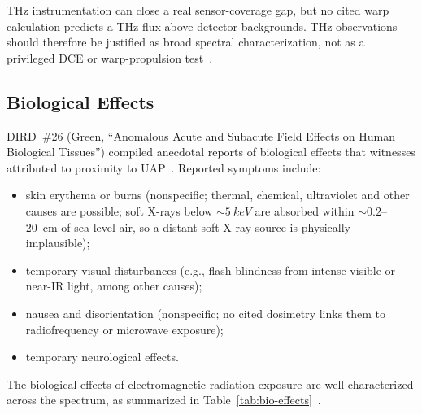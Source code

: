 \documentclass[aps,prd,twocolumn,superscriptaddress,nofootinbib,floatfix]{revtex4-2}
\begin{document}
THz instrumentation can close a real sensor-coverage gap, but no cited warp
calculation predicts a THz flux above detector backgrounds. THz observations should
therefore be justified as broad spectral characterization, not as a privileged DCE
or warp-propulsion test~\cite{Wilson2011,Schutzhold2011}.

\subsection{Biological Effects}\label{sec:bio-effects}

DIRD~\#26 (Green, ``Anomalous Acute and Subacute Field Effects on Human Biological
Tissues'') compiled anecdotal reports of biological effects that witnesses
attributed to proximity to UAP~\cite{DIRD_Green}. Reported symptoms include:
\begin{itemize}
  \item skin erythema or burns (nonspecific; thermal, chemical, ultraviolet and
        other causes are possible; soft X-rays below ${\sim}\SI{5}{keV}$ are
        absorbed within ${\sim}0.2$--\SI{20}{cm} of sea-level air, so a distant
        soft-X-ray source is physically implausible);
  \item temporary visual disturbances (e.g., flash blindness from intense visible
        or near-IR light, among other causes);
  \item nausea and disorientation (nonspecific; no cited dosimetry links them to
        radiofrequency or microwave exposure);
  \item temporary neurological effects.
\end{itemize}
The biological effects of electromagnetic radiation exposure are well-characterized
across the spectrum, as summarized in Table~\ref{tab:bio-effects}~\cite{DIRD_Green}.
\end{document}
